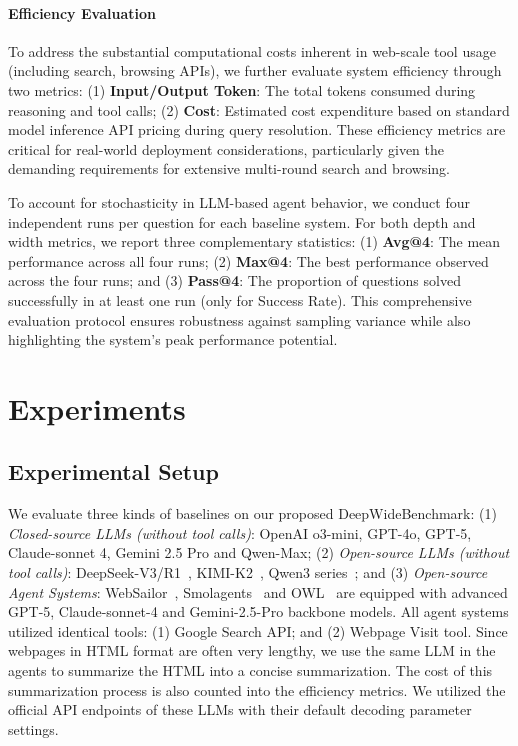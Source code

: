 \documentclass[11pt, letterpaper, logo, onecolumn, copyright, numbering]{paper_improved}
\let\cite\citep
\begin{document}
\paragraph{Efficiency Evaluation}
To address the substantial computational costs inherent in web-scale tool usage (including search, browsing APIs), we further evaluate system efficiency through two metrics: (1) \textbf{Input/Output Token}: The total tokens consumed during reasoning and tool calls; (2) \textbf{Cost}: Estimated cost expenditure based on standard model inference API pricing during query resolution. These efficiency metrics are critical for real-world deployment considerations, particularly given the demanding requirements for extensive multi-round search and browsing.

To account for stochasticity in LLM-based agent behavior, we conduct four independent runs per question for each baseline system. For both depth and width metrics, we report three complementary statistics: (1) \textbf{Avg@4}: The mean performance across all four runs; (2) \textbf{Max@4}: The best performance observed across the four runs; and (3) \textbf{Pass@4}: The proportion of questions solved successfully in at least one run (only for Success Rate). This comprehensive evaluation protocol ensures robustness against sampling variance while also highlighting the system's peak performance potential.


\section{Experiments}

\subsection{Experimental Setup}

We evaluate three kinds of baselines on our proposed DeepWideBenchmark: (1) \textit{Closed-source LLMs (without tool calls)}: OpenAI o3-mini, GPT-4o, GPT-5, Claude-sonnet 4, Gemini 2.5 Pro and Qwen-Max; (2) \textit{Open-source LLMs (without tool calls)}: DeepSeek-V3/R1~\cite{guo2025deepseek,liu2024deepseek}, KIMI-K2~\cite{kimiteam2025kimik2openagentic}, Qwen3 series~\cite{yang2025qwen3technicalreport}; and (3) \textit{Open-source Agent Systems}: WebSailor~\cite{li2025websailor},  Smolagents~\cite{smolagents} and OWL~\cite{hu2025owloptimizedworkforcelearning} are equipped with advanced GPT-5, Claude-sonnet-4 and Gemini-2.5-Pro backbone models. All agent systems utilized identical tools: (1) Google Search API; and (2) Webpage Visit tool. Since webpages in HTML format are often very lengthy, we use the same LLM in the agents to summarize the HTML into a concise summarization. The cost of this summarization process is also counted into the efficiency metrics.
We utilized the official API endpoints of these LLMs with their default decoding parameter settings.
\end{document}
